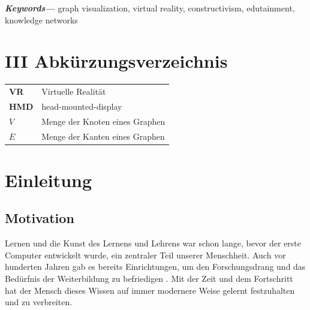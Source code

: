 \documentclass[12pt, a4paper]{article}
\begin{document}
\textbf{\textit{Keywords---}} graph visualization, virtual reality, constructivism, edutainment, knowledge networks
\newpage
\tableofcontents
\newpage
\renewcommand\listfigurename{II Abbildungsverzeichnis}
\listoffigures
\newpage
{}
\section*{III Abkürzungsverzeichnis}
\begin{tabular}{l l}
\textbf{VR} & Virtuelle Realität\\
\textbf{HMD} & head-mounted-display\\
\textbf{$V$} & Menge der Knoten eines Graphen\\
\textbf{$E$} & Menge der Kanten eines Graphen\\
\end{tabular}
\newpage




\section{Einleitung}
\subsection{Motivation}

Lernen und die Kunst des Lernens und Lehrens war schon lange, bevor der erste Computer entwickelt wurde, ein zentraler Teil unserer Menschheit. Auch vor hunderten Jahren gab es bereits Einrichtungen, um den Forschungsdrang und das Bedürfnis der Weiterbildung zu befriedigen \cite[S.~74]{raithel2008einfuhrung}. Mit der Zeit und dem Fortschritt hat der Mensch dieses Wissen auf immer modernere Weise gelernt festzuhalten und zu verbreiten.\\
\end{document}
